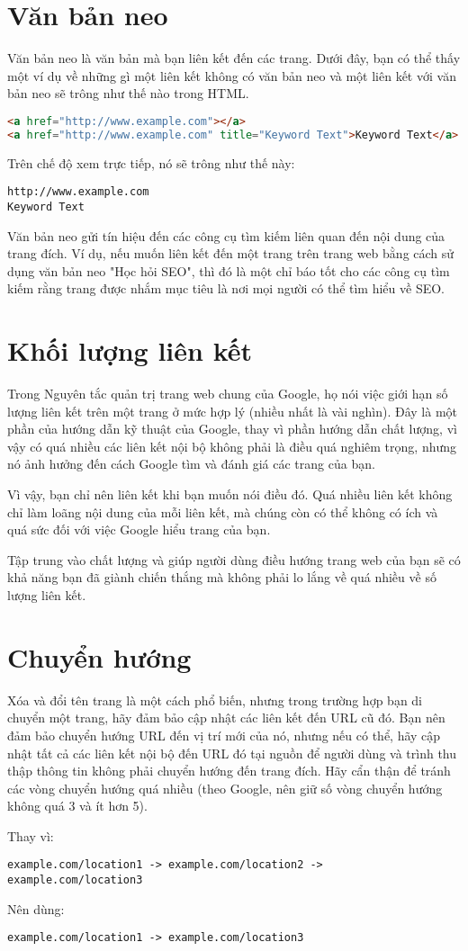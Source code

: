 \section{Văn bản neo}
Văn bản neo là văn bản mà bạn liên kết đến các trang. Dưới đây, bạn có thể thấy một ví dụ về những gì một liên kết không có văn bản neo và một liên kết với văn bản neo sẽ trông như thế nào trong HTML.
\begin{lstlisting}[language=html]
<a href="http://www.example.com"></a>
<a href="http://www.example.com" title="Keyword Text">Keyword Text</a>
\end{lstlisting}
\par
Trên chế độ xem trực tiếp, nó sẽ trông như thế này:
\begin{lstlisting}
http://www.example.com
Keyword Text
\end{lstlisting}
\par
Văn bản neo gửi tín hiệu đến các công cụ tìm kiếm liên quan đến nội dung của trang đích. Ví dụ, nếu muốn liên kết đến một trang trên trang web bằng cách sử dụng văn bản neo "Học hỏi SEO", thì đó là một chỉ báo tốt cho các công cụ tìm kiếm rằng trang được nhắm mục tiêu là nơi mọi người có thể tìm hiểu về SEO.
\section{Khối lượng liên kết}
Trong Nguyên tắc quản trị trang web chung của Google, họ nói việc giới hạn số lượng liên kết trên một trang ở mức hợp lý (nhiều nhất là vài nghìn). Đây là một phần của hướng dẫn kỹ thuật của Google, thay vì phần hướng dẫn chất lượng, vì vậy có quá nhiều các liên kết nội bộ không phải là điều quá nghiêm trọng, nhưng nó ảnh hưởng đến cách Google tìm và đánh giá các trang của bạn.
\par
Vì vậy, bạn chỉ nên liên kết khi bạn muốn nói điều đó. Quá nhiều liên kết không chỉ làm loãng nội dung của mỗi liên kết, mà chúng còn có thể không có ích và quá sức đối với việc Google hiểu trang của bạn.
\par
Tập trung vào chất lượng và giúp người dùng điều hướng trang web của bạn sẽ có khả năng bạn đã giành chiến thắng mà không phải lo lắng về quá nhiều về số lượng liên kết.
\section{Chuyển hướng}
Xóa và đổi tên trang là một cách phổ biến, nhưng trong trường hợp bạn di chuyển một trang, hãy đảm bảo cập nhật các liên kết đến URL cũ đó. Bạn nên đảm bảo chuyển hướng URL đến vị trí mới của nó, nhưng nếu có thể, hãy cập nhật tất cả các liên kết nội bộ đến URL đó tại nguồn để người dùng và trình thu thập thông tin không phải chuyển hướng đến trang đích. Hãy cẩn thận để tránh các vòng chuyển hướng quá nhiều (theo Google, nên giữ số vòng chuyển hướng không quá 3 và ít hơn 5).
\par
Thay vì:
\begin{lstlisting}
example.com/location1 -> example.com/location2 -> example.com/location3
\end{lstlisting}
\par
Nên dùng:
\begin{lstlisting}
example.com/location1 -> example.com/location3
\end{lstlisting}
